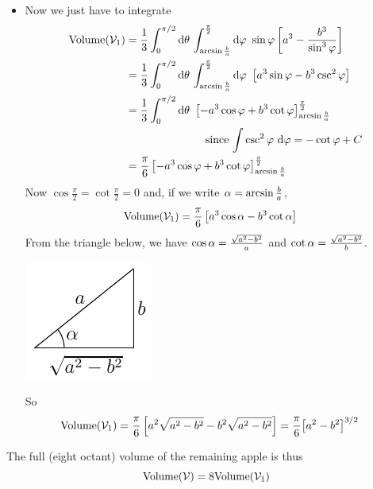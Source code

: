 \begin{eg}
\begin{itemize}
\item
Now we just have to integrate
\begin{align*}
\text{Volume}(\cV_1)
&=\frac{1}{3}\int_0^{\pi/2}\dee{\theta}\,
         \int_{\arcsin\frac{b}{a}}^{\frac{\pi}{2}}  \dee{\varphi}\ 
           \sin\varphi \left[a^3-\frac{b^3}{\sin^3\varphi}\right]\\
&=\frac{1}{3}\int_0^{\pi/2}\dee{\theta}\,
         \int_{\arcsin\frac{b}{a}}^{\frac{\pi}{2}}  \dee{\varphi}\ 
            \left[a^3 \sin\varphi- b^3\csc^2\varphi\right]\\
&=\frac{1}{3}\int_0^{\pi/2}\dee{\theta}\ 
            \left[-a^3 \cos\varphi + b^3\cot\varphi\right]
                        _{\arcsin\frac{b}{a}}^{\frac{\pi}{2}} \\
&\hskip1in\text{since $\int \csc^2\varphi\ \dee{\varphi} =-\cot\varphi+C$} \\
&=\frac{\pi}{6}
            \left[-a^3 \cos\varphi + b^3\cot\varphi\right]
                        _{\arcsin\frac{b}{a}}^{\frac{\pi}{2}} 
\end{align*}
Now $\cos\frac{\pi}{2} = \cot\frac{\pi}{2}=0$ and, if we write 
$\alpha=\arcsin\frac{b}{a}$,
\begin{align*}
\text{Volume}(\mathcal{V}_1)
&=\frac{\pi}{6}
            \left[a^3 \cos\alpha - b^3\cot\alpha\right]
\end{align*}
From the triangle below, we have
$\cos\alpha =\frac{\sqrt{a^2-b^2}}{a} $ and $\cot\alpha=\frac{\sqrt{a^2-b^2}}{b}$.
\begin{efig}
\begin{center}
    \includegraphics{triangleApple.pdf}
\end{center}
\end{efig}
So\begin{align*}
\text{Volume}(\mathcal{V}_1)
&=\frac{\pi}{6}
            \left[a^2 \sqrt{a^2-b^2} - b^2\sqrt{a^2-b^2}\right]
=\frac{\pi}{6}\big[a^2-b^2\big]^{3/2}
\end{align*}
\end{itemize}
The full (eight octant) volume of the remaining apple is thus
\begin{equation*}
\text{Volume}(\cV)
=8 \text{Volume}(\cV_1)

\end{equation*}
\end{eg}
